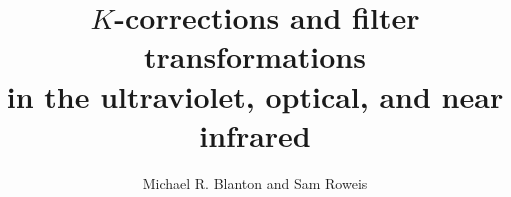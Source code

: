 \documentclass[10pt,preprint]{aastex}
\begin{document}
 
\title{$K$-corrections and filter transformations \\
in the ultraviolet, optical, and near infrared}

\author{
Michael R. Blanton\altaffilmark{\ref{NYU}} and 
Sam Roweis\altaffilmark{\ref{UToronto}}
}
\end{document}
